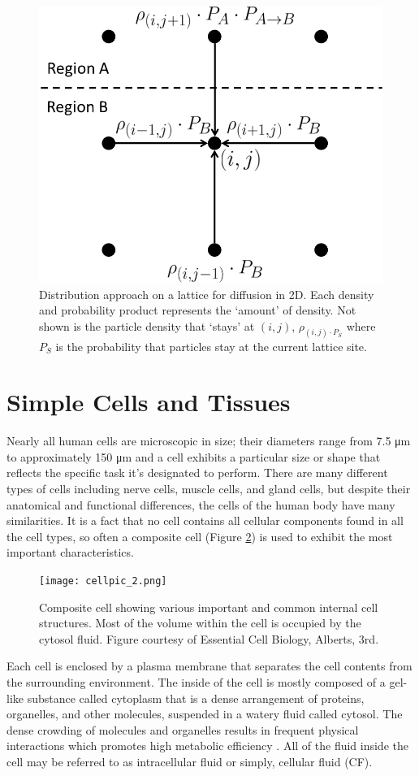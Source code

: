	\begin{figure}[h]
		\centering
		\includegraphics[width=0.6\linewidth]{../images/fd-distribution}
		\caption{Distribution approach on a lattice for diffusion in 2D. Each density and probability product represents the `amount' of density. Not shown is the particle density that `stays' at $ (i,j) $, $ \rho_{(i,j) \cdot P_S} $ where $ P_S $ is the probability that particles stay at the current lattice site.}
		\label{fig:fd-distribution}
	\end{figure}

\clearpage
\section{Simple Cells and Tissues}
\label{sec:intro-cells}
	Nearly all human cells are microscopic in size; their diameters range from 7.5 \si{\micro\meter} to approximately 150 \si{\micro\meter} and a cell exhibits a particular size or shape that reflects the specific task it's designated to perform. There are many different types of cells including nerve cells, muscle cells, and gland cells, but despite their anatomical and functional differences, the cells of the human body have many similarities. It is a fact that no cell contains all cellular components found in all the cell types, so often a composite cell (Figure {\ref{fig:cellpic_2.png}}) is used to exhibit the most important characteristics. 

	\begin{figure}[h]
		\centering
		\texttt{[image: cellpic\_2.png]}
		\caption{Composite cell showing various important and common internal cell structures. Most of the volume within the cell is occupied by the cytosol fluid. Figure courtesy of Essential Cell Biology, Alberts, 3rd.}
		\label{fig:cellpic_2.png}
	\end{figure}

	Each cell is enclosed by a plasma membrane that separates the cell contents from the surrounding environment. The inside of the cell is mostly composed of a gel-like substance called cytoplasm that is a dense arrangement of proteins, organelles, and other molecules, suspended in a watery fluid called cytosol. The dense crowding of molecules and organelles results in frequent physical interactions which promotes high metabolic efficiency \citep{ap}. All of the fluid inside the cell may be referred to as intracellular fluid or simply, cellular fluid (CF).
	
